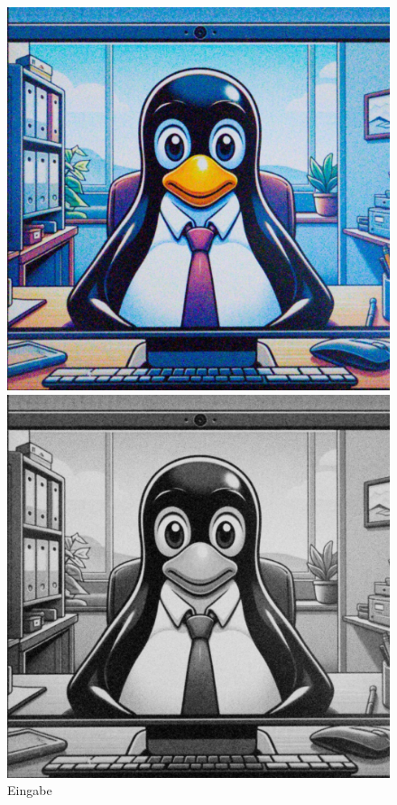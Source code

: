 \documentclass[course=erap]{aspdoc}
\begin{document}
\begin{figure}
    \centering
    \begin{minipage}[t]{.33\linewidth}
        \centering
        \includegraphics[width=\linewidth]{Image/Sample_VideoCall/noisyvideocall.png}
        \caption{Eingabe}
        \label{fig:eingabe}
    \end{minipage}%
    \begin{minipage}[t]{.33\linewidth}
        \centering
        \includegraphics[width=\linewidth]{Image/Sample_VideoCall/noisyvideocall_greyscale.png}

\end{minipage}
\end{figure}
\end{document}
